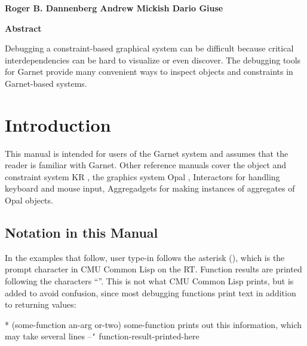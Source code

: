 \begin{titlepage}
\begin{titlebox}
\vspace{0.6 inch}

{\bf Roger B. Dannenberg
Andrew Mickish
Dario Giuse}
\vspace{0.3 line}
\value{date}
\end{titlebox}

\vspace{0.5 inch}
\begin{center}
{\bf Abstract}\end{center}
\begin{text}
Debugging a constraint-based graphical system can be difficult
because critical interdependencies can be hard to visualize
or even discover.  The debugging tools for Garnet
provide many convenient ways to inspect objects and constraints
in Garnet-based systems.

\vspace{0.5 inch}

\end{text}
\end{titlepage}




\chapter{Introduction}
This manual is intended for users of the Garnet system and assumes that
the reader is familiar with Garnet.  Other reference manuals cover
the object and constraint system KR \cite{KRTR2},
the graphics system Opal \cite{OpalMANUAL},
Interactors \cite{InterMANUAL}
for handling keyboard and mouse input, Aggregadgets \cite{AggregadgetsMANUAL}
for making instances of aggregates of Opal objects.

\section{Notation in this Manual}

In the examples that follow, user type-in follows the asterisk (\pr{*}),
which is the prompt character in CMU Common Lisp on the RT.
Function results are printed following the characters ``\pr{-->}''.
This is not what CMU Common Lisp prints, but is added to avoid
confusion, since most debugging functions print text in addition
to returning values:
\begin{programexample}
* (some-function an-arg or-two)
some-function prints out this information,
    which may take several lines
--{\tt\char`\>} function-result-printed-here
\end{programexample}

